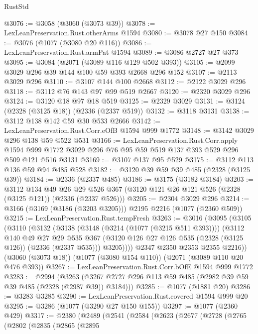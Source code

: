 \begin{lexlean}{RustStd}
\begin{coremodule}
@3076 := @3058 (@3060 (@3073 @39))
@3078 := LexLeanPreservation.Rust.otherArms @1594
@3080 := @3078 @27 @150
@3084 := @3076 (@1077 (@3080 @20 @116))
@3086 := LexLeanPreservation.Rust.armPat @1594
@3089 := @3086 @2727 @27 @373
@3095 := @3084 (@2071 (@3089 @116 @129 @502 @393))
@3105 := @2099 @3029 @296 @39 @144 @100 @59 @393 @2668 @296 @152
@3107 := @2113 @3029 @296
@3110 := @3107 @144 @100 @2668
@3112 := @2122 @3029 @296
@3118 := @3112 @76 @143 @97 @99 @519 @2667
@3120 := @2320 @3029 @296
@3124 := @3120 @18 @97 @18 @519
@3125 := @2329 @3029
@3131 := @3124 (@2328 (@3125 @18)) (@2336 (@2337 @519))
@3132 := @3118 @3131
@3138 := @3112 @138 @142 @59 @30 @533 @2666
@3142 := LexLeanPreservation.Rust.Corr.eOfB @1594 @999 @1772
@3148 := @3142 @3029 @296 @138 @59 @522 @531
@3166 := LexLeanPreservation.Rust.Corr.apply
    @1594
    @999
    @1772
    @3029
    @296
    @76
    @95
    @59
    @519
    @137
    @393
    @529
    @296
    @509
    @121
    @516
    @3131
@3169 := @3107 @137 @95 @529
@3175 := @3112 @113 @136 @59 @94 @485 @528
@3182 := @3120 @39 @59 @39 @485 (@2328 (@3125 @39))
@3184 := @2336 (@2337 @485)
@3186 := @3175 (@3182 @3184)
@3203 := @3112
    @134
    @49
    @26
    @29
    @526
    @367
    (@3120 @121 @26 @121 @526 (@2328 (@3125 @121)) (@2336 (@2337 @526)))
@3205 := @2304 @3029 @296
@3214 := @3166 (@3169 (@3186 (@3203 @3205))) @2195 @2216 (@1077 (@2360 @509))
@3215 := LexLeanPreservation.Rust.tempFresh
@3263 := @3016
    (@3095
      (@3105
        (@3110
          (@3132
            (@3138
              (@3148 (@3214 (@1077 (@3215 @511 @393))))
              (@3112
                @140
                @49
                @27
                @29
                @535
                @367
                (@3120 @126 @27 @126 @535 (@2328 (@3125 @126)) (@2336 (@2337 @535)))
                @3205))))
        @2347
        @2350
        @2353
        @2355
        @2216))
    (@3060 (@3073 @18))
    (@1077 (@3080 @154 @110))
    (@2071 (@3089 @110 @20 @476 @393))
@3267 := LexLeanPreservation.Rust.Corr.bOfE @1594 @999 @1772
@3283 := @2994
    (@3263 (@3267 @2727 @296 @113 @59 @485 (@2982 @39 @59 @39 @485 (@2328 (@2987 @39)) @3184)))
@3285 := @1077 (@1881 @20)
@3286 := @3283 @3285
@3290 := LexLeanPreservation.Rust.covered @1594 @999 @20
@3295 := @3286 (@1077 (@3290 @27 @150 @155))
@3297 := @1077 (@2360 @429)
@3317 := @2380
    (@2489
      (@2541
        (@2584
          (@2623
            (@2677
              (@2728
                (@2765
                  (@2802
                    (@2835
                      (@2865
                        (@2895

\end{coremodule}
\end{lexlean}
